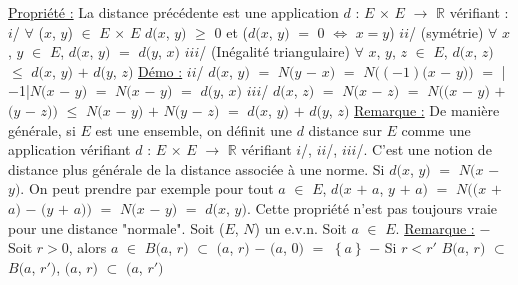 \documentclass{article}
\begin{document}
\smallbreak
\underline{Propriété :} La distance précédente est une application $d$ : $E$ $\times$ $E$ $\rightarrow$ $\mathbb{R}$ vérifiant :
\parindent=1cm
\smallbreak
$i$/ $\forall$ ($x$, $y$) $\in$ $E$ $\times$ $E$ $d(x$, $y)$ $\geqslant$ $0$ et ($d(x$, $y)$ $=$ $0$ $\Longleftrightarrow$ $x = y$) \smallbreak
$ii$/ (symétrie) $\forall$ $x$, $y$ $\in$ $E$, $d(x$, $y)$ $=$ $d(y$, $x)$ \smallbreak
$iii$/ (Inégalité triangulaire) $\forall$ $x$, $y$, $z$ $\in$ $E$, $d(x$, $z)$ $\leqslant$ $d(x$, $y)$ $+$ $d(y$, $z)$ 
\parindent=0cm
\smallbreak
\underline{Démo :} \parindent=1cm \smallbreak $ii$/ $d(x$, $y)$ $=$ $N(y$ $-$ $x)$ $=$ $N((-1)(x$ $-$ $y))$ $=$ |$-$1|$N(x$ $-$ $y)$ $=$ $N(x$ $-$ $y)$ $=$ $d(y$, $x)$ \smallbreak
$iii$/ $d(x$, $z)$ $=$ $N(x$ $-$ $z)$ $=$ $N((x$ $-$ $y)$ $+$ $(y$ $-$ $z))$ $\leqslant$ $N(x$ $-$ $y)$ $+$ $N(y$ $-$ $z)$ $=$ $d(x$, $y)$ $+$ $d(y$, $z)$ 
\parindent=0cm
\smallbreak
\underline{Remarque :} \parindent=1cm \smallbreak De manière générale, si $E$ est une ensemble, on définit une $d$ distance sur $E$ comme une application vérifiant \smallbreak $d$ : $E$ $\times$ $E$ $\rightarrow$ $\mathbb{R}$ vérifiant $i$/, $ii$/, $iii$/.
\parindent=0cm
\smallbreak
C'est une notion de distance plus générale de la distance associée à une norme. Si $d(x$, $y)$ $=$ $N(x$ $-$ $y)$. On peut prendre par exemple pour tout $a$ $\in$ $E$, $d(x$ $+$ $a$, $y$ $+$ $a)$ $=$ $N((x$ $+$ $a)$ $-$ $(y$ $+$ $a))$ $=$ $N(x$ $-$ $y)$ $=$ $d(x$, $y)$. Cette propriété n'est pas toujours vraie pour une distance "normale".
\smallbreak
Soit ($E$, $N$) un e.v.n. Soit $a$ $\in$ $E$.\smallbreak
{}
\smallbreak
\underline{Remarque :} \parindent=1cm \smallbreak
$-$ Soit $r>0$, alors $a$ $\in$ $B(a$, $r)$ $\subset$ \Bbarre$(a$, $r)$ \smallbreak
$-$ \Bbarre$(a$, $0)$ $=$ $\left\{ a \right\}$ \smallbreak
$-$ Si $r<r'$ $B(a$, $r)$ $\subset$ $B(a$, $r')$, \Bbarre$(a$, $r)$ $\subset$ \Bbarre$(a$, $r')$
\end{document}

